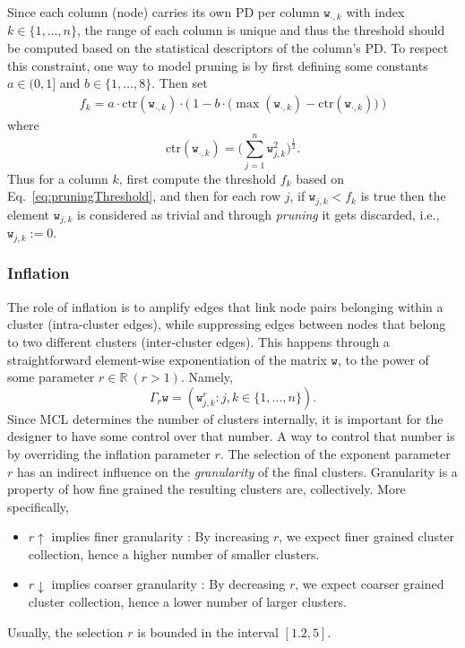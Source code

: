 Since each column (node) carries its own PD per column \(\texttt{w}_{\cdot,k}\) with index \(k \in \{ 1, \dots, n \}\), the range of each column is unique and thus the threshold should be computed based on the statistical descriptors of the column's PD.
To respect this constraint, one way to model pruning is by first defining some constants \(a \in (0, 1]\) and \(b \in \{ 1, \dots, 8 \}\). Then set
\begin{align}
  f_k = a \cdot \text{ctr}(\texttt{w}_{\cdot, k}) \cdot \Big( \ 1 - b \cdot \big( \max( \texttt{w}_{\cdot, k} ) - \text{ctr}(\texttt{w}_{\cdot, k}) \big) \ \Big)
  \label{eq:pruningThreshold}
\end{align}
where
\[
  \text{ctr}(\texttt{w}_{\cdot, k}) = \Bigg( \sum_{j = 1}^{n} \texttt{w}_{j, k}^2 \Bigg)^{\frac{1}{2}}.
\]
Thus for a column \(k\), first compute the threshold \(f_k\) based on Eq.~\ref{eq:pruningThreshold}, and then for each row \(j\), if \( \texttt{w}_{j, k} < f_k \) is true then the element \( \texttt{w}_{j, k} \) is considered as trivial and through \textit{pruning} it gets discarded, i.e., \( \texttt{w}_{j, k} := 0 \).

\subsubsection{Inflation}

The role of inflation is to amplify edges that link node pairs belonging within a cluster (intra-cluster edges), while suppressing edges between nodes that belong to two different clusters (inter-cluster edges).
This happens through a straightforward element-wise exponentiation of the matrix \( \texttt{w} \), to the power of some parameter \( r \in \mathbb{R} \ (r > 1) \). Namely,
\[
  \Gamma_r \texttt{w} = ( \texttt{w}_{j, k}^{r} : j, k \in \{ 1, \dots, n \} ).
\]
Since MCL determines the number of clusters internally, it is important for the designer to have some control over that number. A way to control that number is by overriding the inflation parameter \(r\).
The selection of the exponent parameter \(r\) has an indirect influence on the \textit{granularity} of the final clusters. Granularity is a property of how fine grained the resulting clusters are, collectively. More specifically,
\begin{itemize}
  \item \(r \uparrow\) implies finer granularity : By increasing \(r\), we expect finer grained cluster collection, hence a higher number of smaller clusters.
  \item \(r \downarrow\) implies coarser granularity : By decreasing \(r\), we expect coarser grained cluster collection, hence a lower number of larger clusters.
\end{itemize}
Usually, the selection \(r\) is bounded in the interval \([1.2, 5]\).

